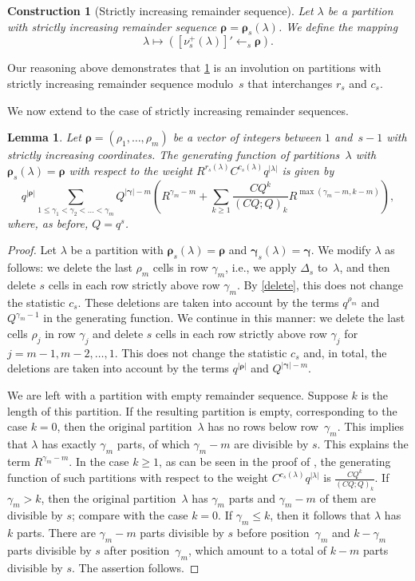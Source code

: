 \documentclass[12pt,reqno]{amsart}
\numberwithin{equation}{section}
\newtheorem{lemma}[theorem]{Lemma}
\newtheorem{construction}{Construction}
\theoremstyle{definition}
\newcommand{\rem}{{\boldsymbol\rho}}
\newcommand{\pos}{{\boldsymbol\gamma}}
\newcommand{\posi}{{\gamma}}
\begin{document}
\begin{construction}[\sc Strictly increasing remainder sequence]
\label{strict}
Let $\lambda$ be a partition with strictly increasing remainder sequence $\rem=\rem_s(\lambda)$. We define the mapping
$$\lambda \mapsto \left(\left[\nu^+_s(\lambda)\right]' \leftarrow_s \rem\right).$$
\end{construction}
Our reasoning above demonstrates that \cref{strict} is an involution on
partitions with strictly increasing remainder sequence modulo~$s$
that interchanges $r_s$ and $c_s$.

\medskip
We now extend  to the case of strictly increasing remainder sequences.
\begin{lemma}
\label{inc}
Let $\rem=(\rho_1,\dots, \rho_m)$ be a vector of integers between $1$ and~$s-1$ with strictly increasing coordinates. The generating function of partitions~$\lambda$
with $\rem_s(\lambda)=\rem$ with respect to the weight
$R^{r_s(\lambda)} C^{c_s(\lambda)} q^{|\lambda|}$ is given by
$$
q^{|\rem|} \sum_{1 \le \posi_1 < \posi_2 < \dots < \posi_m} Q^{|\pos|-m} \left( R^{\posi_m-m} + \sum_{k \ge 1}  \frac{C Q^{k}}{(C Q; Q)_k}
R^{\max(\posi_m-m,k-m)}
\right),
$$
where, as before, $Q=q^s$.
\end{lemma}

\begin{proof}
Let $\lambda$ be a partition with $\rem_s(\lambda)=\rem$ and $\pos_s(\lambda)=\pos$.
We modify $\lambda$ as follows: we delete the last $\rho_m$ cells in row $\posi_m$, i.e., we apply
$\Delta_s$ to~$\lambda$, and then delete $s$ cells in each row
strictly above row $\posi_m$. By 
\cref{delete}, this does not change the statistic $c_s$. These deletions are taken into account by the
terms $q^{\rho_m}$ and $Q^{\posi_m-1}$ in the generating function. We continue in this manner: we delete the last cells $\rho_{j}$ in row $\posi_{j}$ and delete $s$ cells in each row strictly above row $\posi_{j}$ for $j=m-1,m-2,\dots,1$. This does not change the statistic $c_s$ and, in total, the deletions are taken into account by the terms $q^{|\rem|}$ and $Q^{|\pos|-m}$.

We are left with a partition with empty remainder sequence. Suppose
$k$ is the length of this partition.
If the resulting partition is empty, corresponding to the case $k=0$, then the original partition~$\lambda$ has no rows below row~$\posi_m$. This implies that $\lambda$ has exactly $\posi_m$ parts, of which $\posi_m-m$ are divisible by $s$. This explains the term  $R^{\posi_m-m}$.
In the case $k \ge 1$, as can be seen in the proof of , the generating function of such partitions with respect to the weight $C^{c_s(\lambda)} q^{|\lambda|}$
is $\frac{C Q^{k}}{(C Q;Q)_k}$.
If $\posi_m > k$, then the original partition~$\lambda$ has $\posi_m$ parts and $\posi_m-m$ of them are divisible by $s$; compare with the case $k=0$. If $\posi_m \le k$, then it follows that $\lambda$ has $k$ parts. There are $\posi_m-m$ parts divisible by $s$ before position~$\posi_m$ and $k-\posi_m$ parts divisible by $s$ after position~$\posi_m$, which amount to a total of $k-m$ parts divisible by $s$. The assertion follows.
\end{proof}
\end{document}
